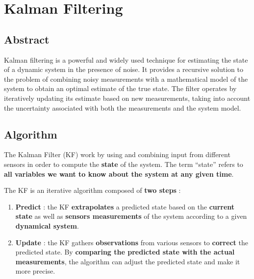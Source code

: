 \documentclass[12pt]{article}
\newenvironment{Shaded}{%
  \begin{center}
  \color{gray!30} %
  \begin{minipage}{0.95\textwidth} %
}{%
  \end{minipage}
  \end{center}
}
\begin{document}
\section{Kalman Filtering}\label{kalman-filtering}

\subsection{Abstract}\label{abstract}

Kalman filtering is a powerful and widely used technique for estimating
the state of a dynamic system in the presence of noise. It provides a
recursive solution to the problem of combining noisy measurements with a
mathematical model of the system to obtain an optimal estimate of the
true state. The filter operates by iteratively updating its estimate
based on new measurements, taking into account the uncertainty
associated with both the measurements and the system model.

\subsection{Algorithm}\label{algorithm}

The Kalman Filter (KF) work by using and combining input from different
sensors in order to compute the \textbf{state} of the system. The term
``state'' refers to \textbf{all variables we want to know about the
system at any given time}.

The KF is an iterative algorithm composed of \textbf{two steps} :

\begin{enumerate}
\def\labelenumi{\arabic{enumi}.}
\item
  \textbf{Predict} : the KF \textbf{extrapolates} a predicted state
  based on the \textbf{current state} as well as \textbf{sensors
  measurements} of the system according to a given \textbf{dynamical
  system}.
\item
  \textbf{Update} : the KF gathers \textbf{observations} from various
  sensors to \textbf{correct} the predicted state. By \textbf{comparing
  the predicted state with the actual measurements}, the algorithm can
  adjust the predicted state and make it more precise.
\end{enumerate}

\begin{Shaded}
\begin{Highlighting}[]
\end{Highlighting}
\end{Shaded}
\end{document}
